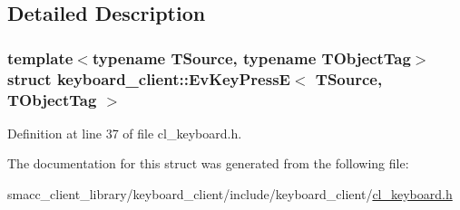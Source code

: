 \subsection{Detailed Description}
\subsubsection*{template$<$typename T\+Source, typename T\+Object\+Tag$>$\newline
struct keyboard\+\_\+client\+::\+Ev\+Key\+Press\+E$<$ T\+Source, T\+Object\+Tag $>$}



Definition at line 37 of file cl\+\_\+keyboard.\+h.



The documentation for this struct was generated from the following file\+:\begin{DoxyCompactItemize}
\item 
smacc\+\_\+client\+\_\+library/keyboard\+\_\+client/include/keyboard\+\_\+client/\hyperlink{cl__keyboard_8h}{cl\+\_\+keyboard.\+h}\end{DoxyCompactItemize}

